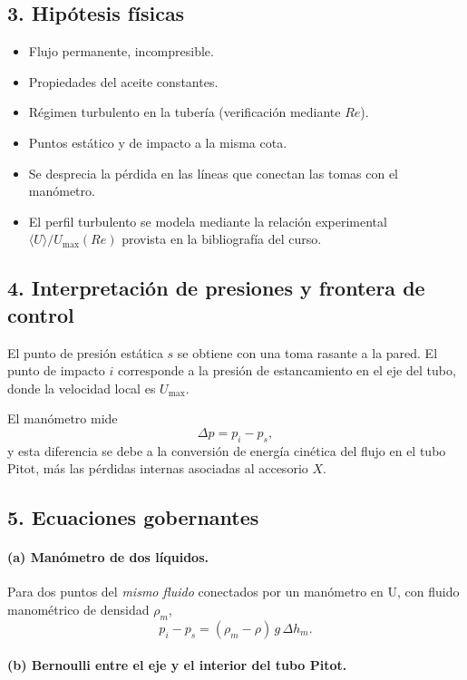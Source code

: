 \documentclass[12pt, a4paper]{article}
\begin{document}
\subsection*{3. Hipótesis físicas}

\begin{itemize}
  \item Flujo permanente, incompresible.
  \item Propiedades del aceite constantes.
  \item Régimen turbulento en la tubería (verificación mediante $Re$).
  \item Puntos estático y de impacto a la misma cota.
  \item Se desprecia la pérdida en las líneas que conectan las tomas con el manómetro.
  \item El perfil turbulento se modela mediante la relación experimental $\langle U\rangle/U_{\max}(Re)$ provista en la bibliografía del curso.
\end{itemize}


\subsection*{4. Interpretación de presiones y frontera de control}

El punto de presión estática $s$ se obtiene con una toma rasante a la pared.  
El punto de impacto $i$ corresponde a la presión de estancamiento en el eje del tubo, donde la velocidad local es $U_{\max}$.  

El manómetro mide
\[
\Delta p = p_i - p_s,
\]
y esta diferencia se debe a la conversión de energía cinética del flujo en el tubo Pitot, más las pérdidas internas asociadas al accesorio $X$.


\subsection*{5. Ecuaciones gobernantes}

\paragraph{(a) Manómetro de dos líquidos.}

Para dos puntos del \emph{mismo fluido} conectados por un manómetro en U, con fluido manométrico de densidad $\rho_m$,
\[
p_i - p_s = (\rho_m - \rho)\,g\,\Delta h_m.
\]

\paragraph{(b) Bernoulli entre el eje y el interior del tubo Pitot.}
\end{document}
